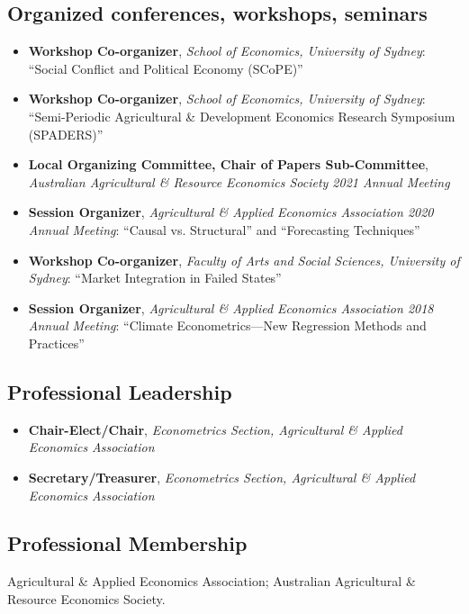 \documentclass[10pt]{article}
\begin{document}
	
	\subsection*{Organized conferences, workshops, seminars}
	\begin{itemize}
		\item {} \textbf{Workshop Co-organizer}, \textsl{School of Economics, University of Sydney}: ``Social Conflict and Political Economy (SCoPE)''
		\item {} \textbf{Workshop Co-organizer}, \textsl{School of Economics, University of Sydney}: ``Semi-Periodic Agricultural \& Development Economics Research Symposium (SPADERS)''
		\item {} \textbf{Local Organizing Committee, Chair of Papers Sub-Committee}, \textsl{Australian Agricultural \& Resource Economics Society 2021 Annual Meeting}
		\item {} \textbf{Session Organizer}, \textsl{Agricultural \& Applied Economics Association 2020 Annual Meeting}: ``Causal vs. Structural'' and ``Forecasting Techniques''
		\item {} \textbf{Workshop Co-organizer}, \textsl{Faculty of Arts and Social Sciences, University of Sydney}: ``Market Integration in Failed States''
		\item {} \textbf{Session Organizer}, \textsl{Agricultural \& Applied Economics Association 2018 Annual Meeting}: ``Climate Econometrics---New Regression Methods and Practices''
	\end{itemize}
	
	
	\subsection*{Professional Leadership}
	\begin{itemize}
		\item {} \textbf{Chair-Elect/Chair}, \textsl{Econometrics Section, Agricultural \& Applied Economics Association}
		\item {} \textbf{Secretary/Treasurer}, \textsl{Econometrics Section, Agricultural \& Applied Economics Association}
	\end{itemize}
	
	\subsection*{Professional Membership}
	Agricultural \& Applied Economics Association; 
	Australian Agricultural \& Resource Economics Society.
	
	
\end{document}
